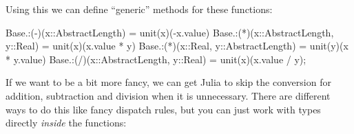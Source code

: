 \documentclass[
]{article}
\newenvironment{Shaded}{\begin{snugshade}}{\end{snugshade}}
\newcommand{\BuiltInTok}[1]{\textcolor[rgb]{0.00,0.23,0.31}{#1}}
\newcommand{\DataTypeTok}[1]{\textcolor[rgb]{0.68,0.00,0.00}{#1}}
\newcommand{\FunctionTok}[1]{\textcolor[rgb]{0.28,0.35,0.67}{#1}}
\newcommand{\NormalTok}[1]{\textcolor[rgb]{0.00,0.23,0.31}{#1}}
\newcommand{\OperatorTok}[1]{\textcolor[rgb]{0.37,0.37,0.37}{#1}}
\begin{document}
Using this we can define ``generic'' methods for these functions:

\begin{Shaded}
\begin{Highlighting}[]
\BuiltInTok{Base}\NormalTok{.}\OperatorTok{:}\NormalTok{(}\OperatorTok{{-}}\NormalTok{)(x}\OperatorTok{::}\DataTypeTok{AbstractLength}\NormalTok{) }\OperatorTok{=} \FunctionTok{unit}\NormalTok{(x)(}\OperatorTok{{-}}\NormalTok{x.value)}
\BuiltInTok{Base}\NormalTok{.}\OperatorTok{:}\NormalTok{(}\OperatorTok{*}\NormalTok{)(x}\OperatorTok{::}\DataTypeTok{AbstractLength}\NormalTok{, y}\OperatorTok{::}\DataTypeTok{Real}\NormalTok{) }\OperatorTok{=} \FunctionTok{unit}\NormalTok{(x)(x.value }\OperatorTok{*}\NormalTok{ y)}
\BuiltInTok{Base}\NormalTok{.}\OperatorTok{:}\NormalTok{(}\OperatorTok{*}\NormalTok{)(x}\OperatorTok{::}\DataTypeTok{Real}\NormalTok{, y}\OperatorTok{::}\DataTypeTok{AbstractLength}\NormalTok{) }\OperatorTok{=} \FunctionTok{unit}\NormalTok{(y)(x }\OperatorTok{*}\NormalTok{ y.value)}
\BuiltInTok{Base}\NormalTok{.}\OperatorTok{:}\NormalTok{(}\OperatorTok{/}\NormalTok{)(x}\OperatorTok{::}\DataTypeTok{AbstractLength}\NormalTok{, y}\OperatorTok{::}\DataTypeTok{Real}\NormalTok{) }\OperatorTok{=} \FunctionTok{unit}\NormalTok{(x)(x.value }\OperatorTok{/}\NormalTok{ y);}
\end{Highlighting}
\end{Shaded}

If we want to be a bit more fancy, we can get Julia to skip the
conversion for addition, subtraction and division when it is
unnecessary. There are different ways to do this like fancy dispatch
rules, but you can just work with types directly \emph{inside} the
functions:
\end{document}
